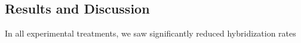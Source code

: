 \subsection{Results and Discussion}

In all experimental treatments, we saw significantly reduced hybridization rates


